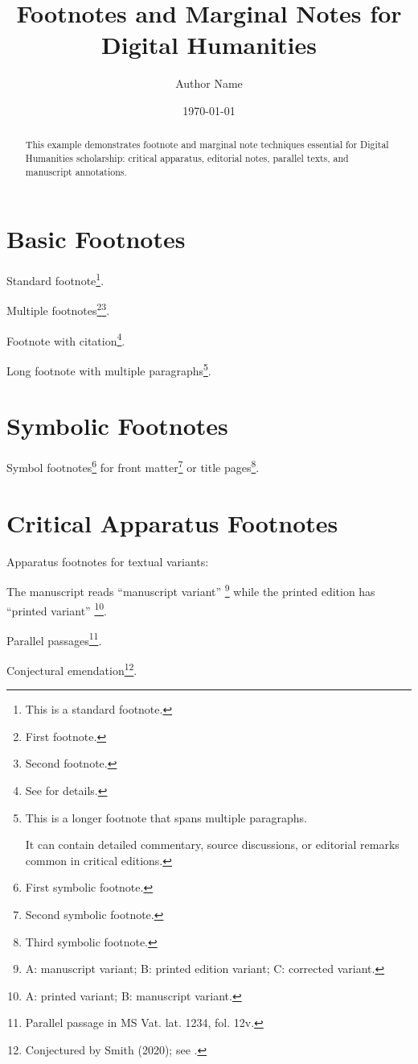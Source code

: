 \documentclass[12pt,a4paper]{article}
\title{Footnotes and Marginal Notes for Digital Humanities}
\author{Author Name}
\date{\today}
\renewcommand{\thefootnote}{\arabic{footnote}}
\begin{document}
\maketitle

\begin{abstract}
This example demonstrates footnote and marginal note techniques
essential for Digital Humanities scholarship: critical apparatus,
editorial notes, parallel texts, and manuscript annotations.
\end{abstract}

\section{Basic Footnotes}\label{sec:basic}
Standard footnote\footnote{This is a standard footnote.}.

Multiple footnotes\footnote{First footnote.}\footnote{Second footnote.}.

Footnote with citation\footnote{See \textcite{knuth1984texbook} for details.}.

Long footnote with multiple paragraphs\footnote{
This is a longer footnote that spans multiple paragraphs.

It can contain detailed commentary, source discussions,
or editorial remarks common in critical editions.
}.

\section{Symbolic Footnotes}\label{sec:symbolic}
\renewcommand{\thefootnote}{\fnsymbol{footnote}}
Symbol footnotes\footnote{First symbolic footnote.}
for front matter\footnote{Second symbolic footnote.}
or title pages\footnote{Third symbolic footnote.}.
\renewcommand{\thefootnote}{\arabic{footnote}}

\section{Critical Apparatus Footnotes}\label{sec:apparatus}
Apparatus footnotes for textual variants:

The manuscript reads ``manuscript variant''
\footnote{A: manuscript variant; B: printed edition variant; C: corrected variant.}
while the printed edition has ``printed variant''
\footnote{A: printed variant; B: manuscript variant.}.

Parallel passages\footnote{Parallel passage in MS Vat. lat. 1234, fol. 12v.}.

Conjectural emendation\footnote{Conjectured by Smith (2020); see \textcite{smith2023dh}.}.
\end{document}

